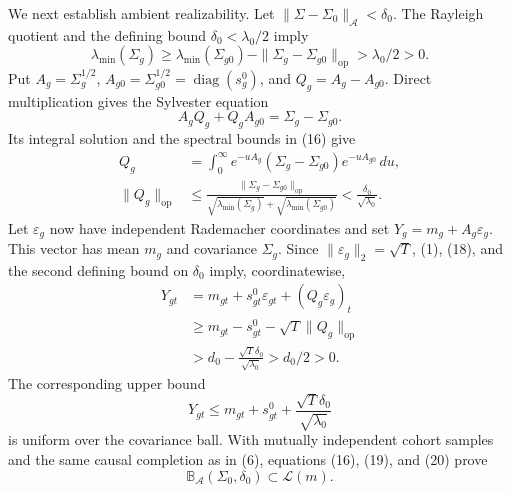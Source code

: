 We next establish ambient realizability.  Let
\(\|\Sigma-\Sigma_0\|_{\mathcal A}<\delta_0\).  The Rayleigh quotient and the defining bound \(\delta_0<\lambda_0/2\) imply
\[
\lambda_{\min}(\Sigma_g)
\ge\lambda_{\min}(\Sigma_{g0})
-\|\Sigma_g-\Sigma_{g0}\|_{\mathrm{op}}
>\lambda_0/2>0.                                                         \tag{16}
\]
Put \(A_g=\Sigma_g^{1/2}\), \(A_{g0}=\Sigma_{g0}^{1/2}=\operatorname{diag}(s_g^0)\), and \(Q_g=A_g-A_{g0}\).  Direct multiplication gives the Sylvester equation
\[
A_gQ_g+Q_gA_{g0}=\Sigma_g-\Sigma_{g0}.                                  \tag{17}
\]
Its integral solution and the spectral bounds in (16) give
\[
\begin{aligned}
Q_g
&=\int_0^\infty e^{-uA_g}(\Sigma_g-\Sigma_{g0})e^{-uA_{g0}}\,du,\\
\|Q_g\|_{\mathrm{op}}
&\le
\frac{\|\Sigma_g-\Sigma_{g0}\|_{\mathrm{op}}}
{\sqrt{\lambda_{\min}(\Sigma_g)}+
 \sqrt{\lambda_{\min}(\Sigma_{g0})}}
<\frac{\delta_0}{\sqrt{\lambda_0}}.                                  \tag{18}
\end{aligned}
\]
Let \(\varepsilon_g\) now have independent Rademacher coordinates and set
\(Y_g=m_g+A_g\varepsilon_g\).  This vector has mean \(m_g\) and covariance \(\Sigma_g\).  Since \(\|\varepsilon_g\|_2=\sqrt T\), (1), (18), and the second defining bound on \(\delta_0\) imply, coordinatewise,
\[
\begin{aligned}
Y_{gt}
&=m_{gt}+s^0_{gt}\varepsilon_{gt}+(Q_g\varepsilon_g)_t\\
&\ge m_{gt}-s^0_{gt}-\sqrt T\|Q_g\|_{\mathrm{op}}\\
&>d_0-\frac{\sqrt T\delta_0}{\sqrt{\lambda_0}}
>d_0/2>0.                                                               \tag{19}
\end{aligned}
\]
The corresponding upper bound
\[
Y_{gt}\le m_{gt}+s^0_{gt}
+\frac{\sqrt T\delta_0}{\sqrt{\lambda_0}}                             \tag{20}
\]
is uniform over the covariance ball.  With mutually independent cohort samples and the same causal completion as in (6), equations (16), (19), and (20) prove
\[
\mathbb B_{\mathcal A}(\Sigma_0,\delta_0)\subset\mathcal L(m).         \tag{21}
\]


